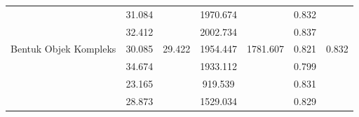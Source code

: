 \begin{table}[]
\begin{tabular}{|l|cc|cc|cc|}
                                                      & \multicolumn{1}{c|}{\cellcolor[HTML]{FFFFFF}31.084} & \cellcolor[HTML]{FFFFFF}                         & \multicolumn{1}{c|}{\cellcolor[HTML]{FFFFFF}1970.674} & \cellcolor[HTML]{FFFFFF}                           & \multicolumn{1}{c|}{\cellcolor[HTML]{FFFFFF}0.832} & \cellcolor[HTML]{FFFFFF}                        \\ \cline{2-2} \cline{4-4} \cline{6-6}
                                                      & \multicolumn{1}{c|}{\cellcolor[HTML]{FFFFFF}32.412} & \cellcolor[HTML]{FFFFFF}                         & \multicolumn{1}{c|}{\cellcolor[HTML]{FFFFFF}2002.734} & \cellcolor[HTML]{FFFFFF}                           & \multicolumn{1}{c|}{\cellcolor[HTML]{FFFFFF}0.837} & \cellcolor[HTML]{FFFFFF}                        \\ \cline{2-2} \cline{4-4} \cline{6-6}
  \multirow{-5}{*}{Bentuk Objek Kompleks}             & \multicolumn{1}{c|}{\cellcolor[HTML]{FFFFFF}30.085} & \multirow{-5}{*}{\cellcolor[HTML]{FFFFFF}29.422} & \multicolumn{1}{c|}{\cellcolor[HTML]{FFFFFF}1954.447} & \multirow{-5}{*}{\cellcolor[HTML]{FFFFFF}1781.607} & \multicolumn{1}{c|}{\cellcolor[HTML]{FFFFFF}0.821} & \multirow{-5}{*}{\cellcolor[HTML]{FFFFFF}0.832} \\ \hline
                                                      & \multicolumn{1}{c|}{\cellcolor[HTML]{FFFFFF}34.674} & \cellcolor[HTML]{FFFFFF}                         & \multicolumn{1}{c|}{\cellcolor[HTML]{FFFFFF}1933.112} & \cellcolor[HTML]{FFFFFF}                           & \multicolumn{1}{c|}{\cellcolor[HTML]{FFFFFF}0.799} & \cellcolor[HTML]{FFFFFF}                        \\ \cline{2-2} \cline{4-4} \cline{6-6}
                                                      & \multicolumn{1}{c|}{\cellcolor[HTML]{FFFFFF}23.165} & \cellcolor[HTML]{FFFFFF}                         & \multicolumn{1}{c|}{\cellcolor[HTML]{FFFFFF}919.539}  & \cellcolor[HTML]{FFFFFF}                           & \multicolumn{1}{c|}{\cellcolor[HTML]{FFFFFF}0.831} & \cellcolor[HTML]{FFFFFF}                        \\ \cline{2-2} \cline{4-4} \cline{6-6}
                                                      & \multicolumn{1}{c|}{\cellcolor[HTML]{FFFFFF}28.873} & \cellcolor[HTML]{FFFFFF}                         & \multicolumn{1}{c|}{\cellcolor[HTML]{FFFFFF}1529.034} & \cellcolor[HTML]{FFFFFF}                           & \multicolumn{1}{c|}{\cellcolor[HTML]{FFFFFF}0.829} & \cellcolor[HTML]{FFFFFF}                        \\ \cline{2-2} \cline{4-4} \cline{6-6}

\end{tabular}
\end{table}
